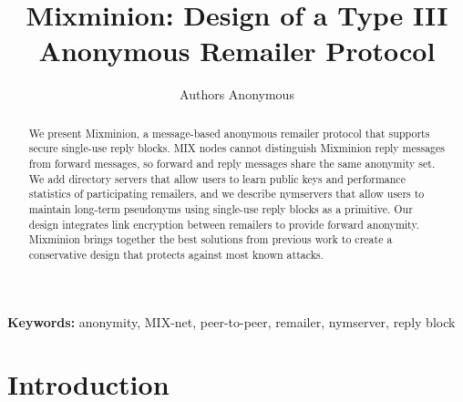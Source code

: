 \documentclass{llncs}
\newcommand\emailaddr{\begingroup \def\UrlLeft{<}\def\UrlRight{>}\urlstyle{tt}\Url}
\begin{document}

\title{Mixminion: Design of a Type III Anonymous Remailer Protocol}

% 
\author{Authors Anonymous}
\institute{}


\maketitle
\pagestyle{plain} 
  
\begin{abstract}

We present Mixminion, a message-based anonymous remailer protocol that
supports secure single-use reply blocks. MIX nodes cannot distinguish
Mixminion reply messages from forward messages, so forward and reply
messages share
the same anonymity set. We add directory servers that allow users to
learn public keys and performance statistics of participating remailers,
and we describe nymservers that allow users to maintain long-term
pseudonyms using single-use reply blocks as a primitive. Our design
integrates link encryption between remailers to provide
forward anonymity. Mixminion brings together the best solutions from
previous work to create a conservative design that protects against most
known attacks.


\end{abstract}

\noindent \textbf{Keywords:} anonymity, MIX-net, peer-to-peer, remailer, nymserver, reply block


\section{Introduction}
\label{sec:intro}
\end{document}
